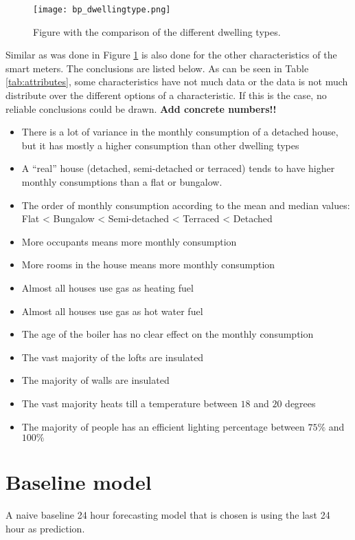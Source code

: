 \begin{figure}[h!]
	\centering
	\texttt{[image: bp\_dwellingtype.png]}
	\caption{Figure with the comparison of the different dwelling types.}
	\label{fig:bp_dwellingtype}
\end{figure}





Similar as was done in Figure \ref{fig:bp_dwellingtype} is also done for the other characteristics of the smart meters. The conclusions are listed below. As can be seen in Table \ref{tab:attributes}, some characteristics have not much data or the data is not much distribute over the different options of a characteristic. If this is the case, no reliable conclusions could be drawn. \textbf{Add concrete numbers!!}

\begin{itemize}
	\item There is a lot of variance in the monthly consumption of a detached house, but it has mostly a higher consumption than other dwelling types
	\item A ``real'' house (detached, semi-detached or terraced) tends to have higher monthly consumptions than a flat or bungalow.  
	\item The order of monthly consumption according to the mean and median values: Flat < Bungalow < Semi-detached < Terraced < Detached
	\item More occupants means more monthly consumption
	\item More rooms in the house means more monthly consumption
	\item Almost all houses use gas as heating fuel
	\item Almost all houses use gas as hot water fuel
	\item The age of the boiler has no clear effect on the monthly consumption
	\item The vast majority of the lofts are insulated
	\item The majority of walls are insulated
	\item The vast majority heats till a temperature between $ 18 $ and $ 20  $ degrees
	\item The majority of people has an efficient lighting percentage between $ 75\% $ and $ 100\% $
	
\end{itemize}


\section{Baseline model}
A naive baseline 24 hour forecasting model that is chosen is using the last 24 hour as prediction.




